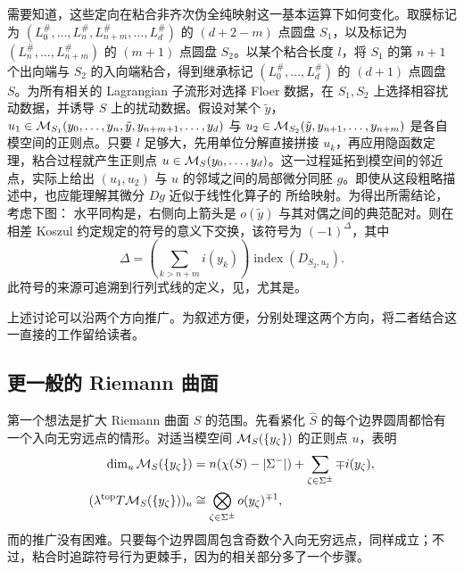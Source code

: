 需要知道，这些定向在粘合非齐次伪全纯映射这一基本运算下如何变化。取膜标记为 $(L_0^\#,\allowbreak \ldots,\allowbreak L_n^\#,\allowbreak L_{n+m}^\#,\allowbreak \ldots,\allowbreak L_d^\#)$ 的 $(d+2-m)$ 点圆盘 $S_1$，以及标记为 $(L_n^\#,\allowbreak \ldots,\allowbreak L_{n+m}^\#)$ 的 $(m+1)$ 点圆盘 $S_2$。以某个粘合长度 $l$，将 $S_1$ 的第 $n+1$ 个出向端与 $S_2$ 的入向端粘合，得到继承标记 $(L_0^\#,\allowbreak \ldots,\allowbreak L_d^\#)$ 的 $(d+1)$ 点圆盘 $S$。为所有相关的 Lagrangian 子流形对选择 Floer 数据，在 $S_1,\allowbreak S_2$ 上选择相容扰动数据，并诱导 $S$ 上的扰动数据。假设对某个 $\tilde y$，$u_1\in\mathcal M_{S_1}(y_0,\allowbreak \ldots,\allowbreak y_n,\allowbreak \tilde y,\allowbreak y_{n+m+1},\allowbreak \ldots,\allowbreak y_d)$ 与 $u_2\in\mathcal M_{S_2}(\tilde y,\allowbreak y_{n+1},\allowbreak \ldots,\allowbreak y_{n+m})$ 是各自模空间的正则点。只要 $l$ 足够大，先用单位分解直接拼接 $u_k$，再应用隐函数定理，粘合过程就产生正则点 $u\in\mathcal M_S(y_0,\allowbreak \ldots,\allowbreak y_d)$。这一过程延拓到模空间的邻近点，实际上给出 $(u_1,\allowbreak u_2)$ 与 $u$ 的邻域之间的局部微分同胚 $g$。即使从这段粗略描述中，也应能理解其微分 $Dg$ 近似于线性化算子的
所给映射。为得出所需结论，考虑下图：
水平同构是，右侧向上箭头是 $o(\tilde y)$ 与其对偶之间的典范配对。则在相差 Koszul 约定规定的符号的意义下交换，该符号为 $(-1)^\Delta$，其中
\[
\Delta=\left(\sum_{k>n+m}i(y_k)\right)\operatorname{index}(D_{S_2,u_2}).
\]
此符号的来源可追溯到行列式线的定义，见，尤其是。

上述讨论可以沿两个方向推广。为叙述方便，分别处理这两个方向，将二者结合这一直接的工作留给读者。

\subsection{更一般的 Riemann 曲面}\label{sec:12c}
第一个想法是扩大 Riemann 曲面 $S$ 的范围。先看紧化 $\hat S$ 的每个边界圆周都恰有一个入向无穷远点的情形。对适当模空间 $\mathcal M_S(\{y_\zeta\})$ 的正则点 $u$，表明
\[
\begin{aligned}
\dim_u\mathcal M_S(\{y_\zeta\})&=n(\chi(S)-|\Sigma^-|)+\sum_{\zeta\in\Sigma^\pm}\mp i(y_\zeta),\\
(\lambda^{\mathrm{top}}T\mathcal M_S(\{y_\zeta\}))_u&\cong\bigotimes_{\zeta\in\Sigma^\pm}o(y_\zeta)^{\mp1},
\end{aligned}
\]
而的推广没有困难。只要每个边界圆周包含奇数个入向无穷远点，同样成立；不过，粘合时追踪符号行为更棘手，因为的相关部分多了一个步骤。

